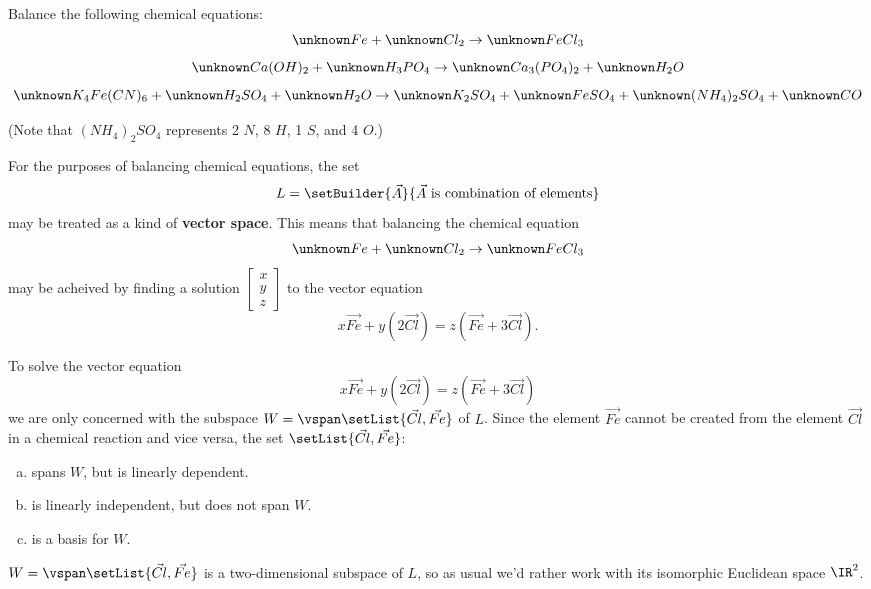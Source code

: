 \begin{applicationActivities}
\begin{activity}{15}
  Balance the following chemical equations:
  \[
    \unknown Fe + \unknown Cl_2
      \rightarrow
    \unknown FeCl_3
  \]
  \[
    \unknown Ca(OH)_2 + \unknown H_3PO_4
      \rightarrow
    \unknown Ca_3(PO_4)_2 + \unknown H_2O
  \]
  \[
    \unknown K_4Fe(CN)_6 + \unknown H_2SO_4 + \unknown H_2O
      \rightarrow
    \unknown K_2SO_4 + \unknown FeSO_4 + \unknown (NH_4)_2SO_4 + \unknown CO
  \]

  (Note that \((NH_4)_2SO_4\) represents 2 \(N\), 8 \(H\), 1 \(S\),
  and 4 \(O\).)
\end{activity}

\begin{observation}
  For the purposes of balancing chemical equations, the set
  \[
    L
      =
    \setBuilder{\vec{A}}{\vec{A}\text{ is combination of elements}}
  \]
  may be treated as a kind of \textbf{vector space}.
  This means that balancing the chemical equation
  \[
    \unknown Fe + \unknown Cl_2
      \rightarrow
    \unknown FeCl_3
  \]
  may be acheived by finding a solution \(\begin{bmatrix}x\\y\\z\end{bmatrix}\)
  to the vector equation
  \[
    x\vec{Fe} + y(2\vec{Cl})
      =
    z(\vec{Fe}+3\vec{Cl})
  .\]
\end{observation}

\begin{activity}{5}
  To solve the vector equation
  \[
    x\vec{Fe} + y(2\vec{Cl})
      =
    z(\vec{Fe}+3\vec{Cl})
  \]
  we are only concerned with the subspace
  \(W=\vspan\setList{\vec{Cl},\vec{Fe}}\)
  of \(L\). Since the element \(\vec{Fe}\) cannot be created from the element
  \(\vec{Cl}\) in a chemical reaction and vice versa, the set
  \(\setList{\vec{Cl},\vec{Fe}}\):
  \begin{enumerate}[a)]
    \item spans \(W\), but is linearly dependent.
    \item is linearly independent, but does not span \(W\).
    \item is a basis for \(W\).
  \end{enumerate}
\end{activity}

\begin{observation}
  \(W=\vspan\setList{\vec{Cl},\vec{Fe}}\) is a two-dimensional subspace of
  \(L\), so as usual we'd rather work with its isomorphic Euclidean space
  \(\IR^2\).


\end{observation}
\end{applicationActivities}
